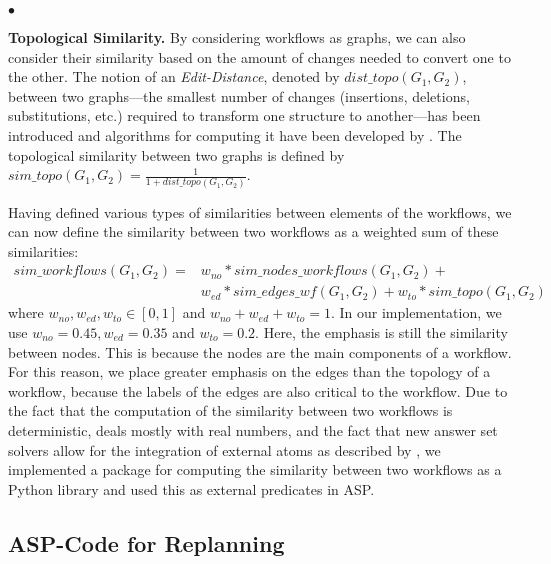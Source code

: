 \documentclass{new_tlp}
\begin{document}
{\begin{list}{$\bullet$}{\itemsep=0pt \parsep=1pt \topsep=1pt \leftmargin=10pt}
 

\item {\bf  Topological Similarity.} 
By considering workflows as graphs, we can also consider their similarity based on the amount of changes needed to convert one to the other. The notion 
of an \emph{Edit-Distance}, denoted by $dist\_topo(G_1,G_2)$, between two graphs---the smallest number of changes (insertions, deletions, 
substitutions, etc.) required to transform one structure to another---has been introduced and algorithms for computing it have been 
developed by . The topological similarity between two graphs is defined by  
          $sim\_topo(G_1,G_2) =  \frac{1}{1 + dist\_topo(G_1,G_2)}$.

 
\end{list}   
  

Having defined various types of similarities between elements of the workflows, we can now define the similarity between two workflows as a weighted sum of these similarities:  
  \[\begin{array}{ll} 
  sim\_workflows(G_1,G_2) =  & w_{no}*sim\_nodes\_workflows(G_1,G_2) +  \\
   & w_{ed}*sim\_edges\_wf(G_1,G_2) + w_{to}*sim\_topo(G_1,G_2)
  \end{array} \]
 where  $w_{no}, w_{ed}, w_{to} \in [0,1]$ and  
 $w_{no} + w_{ed} + w_{to} = 1$. 
  In our implementation, we use  $w_{no}=0.45, w_{ed}=0.35$  and $w_{to}=0.2$. Here, the emphasis is still the similarity between nodes. This is because the nodes are the main components of a workflow. 
  For this reason, we place greater emphasis  on the edges than the topology of a workflow, because the labels of the edges are also critical to the workflow. 
Due to the fact that the computation of the similarity between two workflows is deterministic,  deals mostly with real numbers,
 and the fact that new answer set solvers allow for the integration of external atoms as described by \cite{KaminskiSW17}, 
we implemented a package for computing the similarity between two workflows as a Python library and used this as external predicates in ASP. 

 
%
\subsection{ASP-Code for Replanning}
\label{sub:asp_preferences_desires}

}
\end{document}
